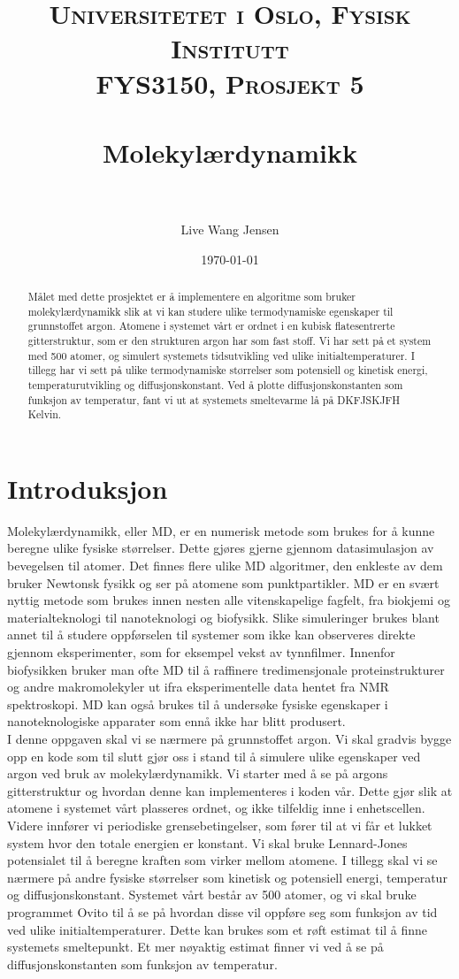 \documentclass[paper=a4, fontsize=11pt]{scrartcl} %
\title{	
\normalfont \normalsize 
\textsc{Universitetet i Oslo, Fysisk Institutt \\
										FYS3150, Prosjekt 5} \\ [25pt] %
\horrule{0.5pt} \\[0.4cm] %
\huge Molekylærdynamikk \\ %
\horrule{2pt} \\[0.5cm] %
}
\author{Live Wang Jensen} %
\date{\normalsize\today} %
\numberwithin{equation}{section} %
\numberwithin{figure}{section} %
\numberwithin{table}{section} %
\begin{document}
\maketitle 
\begin{abstract}
Målet med dette prosjektet er å implementere en algoritme som bruker molekylærdynamikk slik at vi kan studere ulike termodynamiske egenskaper til grunnstoffet argon.  Atomene i systemet vårt er ordnet i en kubisk flatesentrerte gitterstruktur, som er den strukturen argon har som fast stoff. Vi har sett på et system med 500 atomer, og simulert systemets tidsutvikling ved ulike initialtemperaturer. I tillegg har vi sett på ulike termodynamiske størrelser som potensiell og kinetisk energi, temperaturutvikling og diffusjonskonstant. Ved å plotte diffusjonskonstanten som funksjon av temperatur, fant vi ut at systemets smeltevarme lå på DKFJSKJFH Kelvin.

\end{abstract}

\tableofcontents


\section{Introduksjon}
Molekylærdynamikk, eller MD, er en numerisk metode som brukes for å kunne beregne ulike fysiske størrelser. Dette gjøres gjerne gjennom datasimulasjon av bevegelsen til atomer. Det finnes flere ulike MD algoritmer, den enkleste av dem bruker Newtonsk fysikk og ser på atomene som punktpartikler. MD er en svært nyttig metode som brukes innen nesten alle vitenskapelige fagfelt, fra biokjemi og materialteknologi til nanoteknologi og biofysikk. Slike simuleringer brukes blant annet til å studere oppførselen til systemer som ikke kan observeres direkte gjennom eksperimenter, som for eksempel vekst av tynnfilmer. Innenfor biofysikken bruker man ofte MD til å raffinere tredimensjonale proteinstrukturer og andre makromolekyler ut ifra eksperimentelle data hentet fra NMR spektroskopi. MD kan også brukes til å undersøke fysiske egenskaper i nanoteknologiske apparater som ennå ikke har blitt produsert. 
\\

I denne oppgaven skal vi se nærmere på grunnstoffet argon. Vi skal gradvis bygge opp en kode som til slutt gjør oss i stand til å simulere ulike egenskaper ved argon ved bruk av molekylærdynamikk. Vi starter med å se på argons gitterstruktur og hvordan denne kan implementeres i koden vår. Dette gjør slik at atomene i systemet vårt plasseres ordnet, og ikke tilfeldig inne i enhetscellen. Videre innfører vi periodiske grensebetingelser, som fører til at vi får et lukket system hvor den totale energien er konstant. Vi skal bruke Lennard-Jones potensialet til å beregne kraften som virker mellom atomene. I tillegg skal vi se nærmere på andre fysiske størrelser som kinetisk og potensiell energi, temperatur og diffusjonskonstant. Systemet vårt består av 500 atomer, og vi skal bruke programmet Ovito til å se på hvordan disse vil oppføre seg som funksjon av tid ved ulike initialtemperaturer. Dette kan brukes som et røft estimat til å finne systemets smeltepunkt. Et mer nøyaktig estimat finner vi ved å se på diffusjonskonstanten som funksjon av temperatur.
\end{document}
